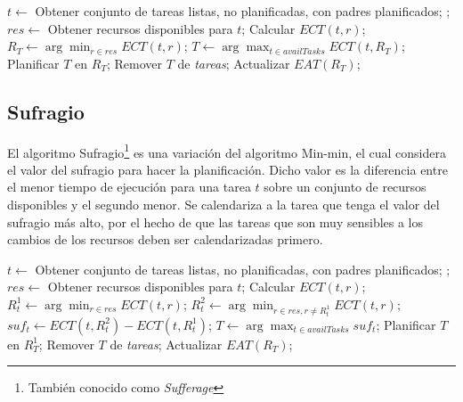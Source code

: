 \label{alg:max-min}
\begin{algorithmic}[1]
	\State $t \gets$ Obtener conjunto de tareas listas, no planificadas, con padres planificados;
	\State {};
\EndWhile
{}
			\State $res \gets$ Obtener recursos disponibles para $t$;
				\State Calcular $ECT(t,r)$;
			\EndFor
			\State $R_T \gets \arg\min_{r \in res}ECT(t,r)$;
		\EndFor
		\State $T \gets \arg\max_{t \in availTasks}ECT(t,R_T)$;
		\State Planificar $T$ en $R_T$;
		\State Remover $T$ de \emph{tareas};
		\State Actualizar $EAT(R_T)$;
	\EndWhile
\EndProcedure
\end{algorithmic}

\subsection{Sufragio}
El algoritmo Sufragio\footnote{También conocido como \emph{Sufferage}} \cite{maheswaran1999dynamic} es una variación del algoritmo Min-min, el cual considera el valor del sufragio para hacer la planificación. Dicho valor es la diferencia entre el menor tiempo de ejecución para una tarea $t$ sobre un conjunto de recursos disponibles y el segundo menor. Se calendariza a la tarea que tenga el valor del sufragio más alto, por el hecho de que las tareas que son muy sensibles a los cambios de los recursos deben ser calendarizadas primero. 

\label{alg:sufferage}
\begin{algorithmic}[1]
	\State $t \gets$ Obtener conjunto de tareas listas, no planificadas, con padres planificados;
	\State {};
\EndWhile
{}
			\State $res \gets$ Obtener recursos disponibles para $t$;
				\State Calcular $ECT(t,r)$;
			\EndFor
			\State $R^1_t \gets \arg\min_{r \in res}ECT(t,r)$;
			\State $R^2_t \gets \arg\min_{r \in res, r \ne{R^1_t}}ECT(t,r)$;
			\State $suf_t \gets ECT(t,R^2_t) - ECT(t,R^1_t)$;
		\EndFor
		\State $T \gets \arg\max_{t \in availTasks}suf_t$;
		\State Planificar $T$ en $R^1_T$;
		\State Remover $T$ de \emph{tareas};
		\State Actualizar $EAT(R_T)$;
	\EndWhile
\EndProcedure
\end{algorithmic}

